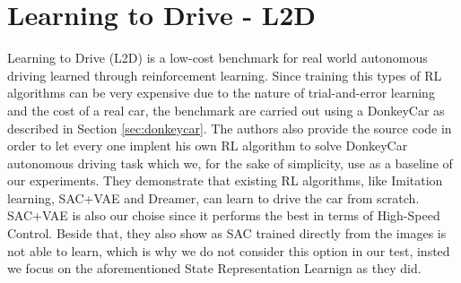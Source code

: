 \section{Learning to Drive - L2D}
Learning to Drive (L2D) \citep{DBLP:journals/corr/abs-2008-00715} is a low-cost benchmark for real world autonomous driving learned through reinforcement learning. Since training this types of RL algorithms can be very expensive due to the nature of trial-and-error learning and the cost of a real car, the benchmark are carried out using a DonkeyCar as described in Section \ref{sec:donkeycar}. The authors also provide the source code in order to let every one implent his own RL algorithm to solve DonkeyCar autonomous driving task which we, for the sake of simplicity, use as a baseline of our experiments. They demonstrate that existing RL
algorithms, like Imitation learning, SAC+VAE and Dreamer, can learn to drive the car from scratch. SAC+VAE is also our choise since it performs the best in terms of High-Speed Control. Beside that, they also show as SAC trained directly from the images is not able to learn, which is why we do not consider this option in our test, insted we focus on the aforementioned State Representation Learnign as they did.